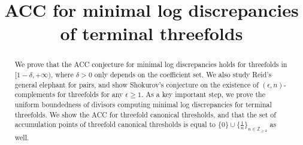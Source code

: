 \documentclass[11pt]{amsart}
\numberwithin{equation}{section}
\newcommand\luo[1]{\todo[color=red!40]{#1}} %
\newcommand{\Zz}{\mathbb{Z}}
\newcommand{\Ii}{{\Gamma}}
\theoremstyle{definition}
\theoremstyle{definition}
\begin{document}
\title{ACC for minimal log discrepancies of terminal threefolds}




\begin{abstract}
We prove that the ACC conjecture for minimal log discrepancies holds for threefolds in $[1-\delta,+\infty)$, where $\delta>0$ only depends on the coefficient set. We also study Reid's general elephant for pairs, and show Shokurov's conjecture on the existence of $(\epsilon,n)$-complements for threefolds for any $\epsilon\geq 1$. As a key important step, we prove the uniform boundedness of divisors computing minimal log discrepancies for terminal threefolds. We show the ACC for threefold canonical thresholds, and that the set of accumulation points of threefold canonical thresholds is equal to $\{0\}\cup\{\frac{1}{n}\}_{n\in\mathbb Z_{\ge 2}}$ as well. 
\end{abstract}

\end{document}
